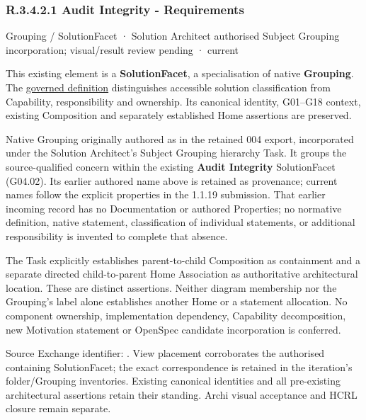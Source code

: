 \subsubsection*{R.3.4.2.1 Audit Integrity - Requirements}
\label{navigation:R.3.4.2.1}

\label{element:de3ff3302e504029b5b5f3f18fe9c380}
{\small Grouping / SolutionFacet · Solution Architect authorised Subject Grouping incorporation; visual/result review pending · current}\par

This existing element is a \textbf{SolutionFacet}, a specialisation of native
\textbf{Grouping}. The \href{\detokenize{../../../../../../../governance/continuum-representation.md#solutionfacet-classification--1119-candidate}}{governed definition}
distinguishes accessible solution classification from Capability, responsibility
and ownership. Its canonical identity, G01–G18 context, existing Composition
and separately established Home assertions are preserved.



Native Grouping originally authored as \texttt{} in the retained 004 export,
incorporated under the Solution Architect's Subject Grouping hierarchy Task.
It groups the source-qualified \texttt{} concern within
the existing \textbf{Audit Integrity} SolutionFacet (G04.02). Its earlier authored name above is retained as provenance; current names
follow the explicit properties in the 1.1.19 submission.
That earlier incoming record has no Documentation or authored Properties; no normative
definition, native statement, classification of individual statements, or
additional responsibility is invented to complete that absence.



The Task explicitly establishes parent-to-child Composition as containment and
a separate directed child-to-parent Home Association as authoritative architectural
location. These are distinct assertions. Neither diagram membership nor the
Grouping's label alone establishes another Home or a statement allocation.
No component ownership, implementation dependency, Capability decomposition,
new Motivation statement or OpenSpec candidate incorporation is conferred.



Source Exchange identifier: \texttt{}. View placement corroborates
the authorised containing SolutionFacet; the exact correspondence is retained in the
iteration's folder/Grouping inventories. Existing canonical identities and all
pre-existing architectural assertions retain their standing. Archi visual
acceptance and HCRL closure remain separate.



